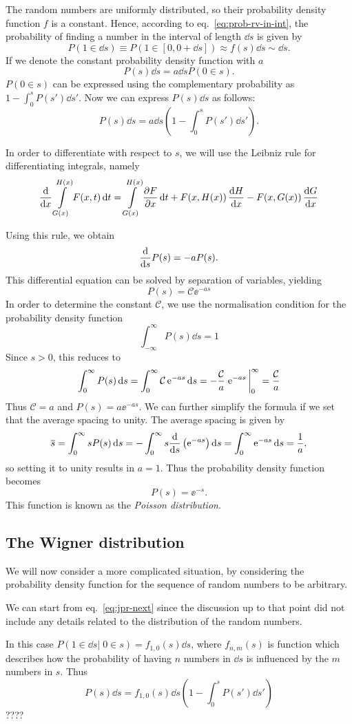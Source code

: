 \documentclass[../thesis.tex]{subfiles}
\theoremstyle{definition}
\begin{document}
The random numbers are uniformly distributed, so their probability density function
\(f\) is a constant. Hence, according to eq.~\eqref{eq:prob-rv-in-int}, the probability
of finding a number in the interval of length \( \dd{s} \) is given by
\[
  P(1 \in \dd{s}) \equiv P(1 \in [0, 0+\dd{s}]) \approx f(s) \dd{s} \sim \dd{s}.
\]
If we denote the constant probability density function with $a$
\[
  P(s)\dd{s} = a \dd{s} P(0 \in s).
\]
\( P(0 \in s) \) can be expressed using the complementary probability as
\( {1 - \int_0^s P(s') \dd{s'}} \). Now we can express \( P(s)\dd{s} \) as follows:
\[
  P(s)\dd{s} = a \dd{s} \left( 1 - \int_0^s P(s') \dd{s'} \right).
\]

In order to differentiate with respect to $s$, we will use the Leibniz rule
for differentiating integrals, namely
\begin{equation}
  \label{eq:leibnitz}
  \dv{x} \int\limits_{G(x)}^{H(x)} F(x, t) \dd{t} = \int\limits_{G(x)}^{H(x)} \pdv{F}{x} \dd{t}
  + F(x, H(x))\, \dv{H}{x} - F(x, G(x))\, \dv{G}{x}
\end{equation}

Using this rule, we obtain
\[
  \dv{s}P(s) = -aP(s).
\]
This differential equation can be solved by separation of variables, yielding
\[
  P(s) = \mathcal{C} \ee^{-as}
\]
In order to determine the constant \(\mathcal{C}\), we use the normalisation condition
for the probability density function
\[
  \int_{-\infty}^{\infty} P(s) \dd{s} = 1
\]
Since \(s>0\), this reduces to
\[
  \int_{0}^{\infty} P(s) \dd{s} = \int_{0}^{\infty} \mathcal{C} \ee^{-as} \dd{s}
  = -\frac{\mathcal{C}}{a} \eval{\ee^{-as}}_0^{\infty} = \frac{\mathcal{C}}{a}
\]
Thus \(\mathcal{C} = a\) and \(P(s) = a \ee^{-as}\).
We can further simplify the formula if we set that the average spacing to unity.
The average spacing is given by
\[
  \overline{s} = \int_{0}^{\infty} s P(s) \dd{s}
  = -\int_{0}^{\infty} s \dv{s} \left( \operatorname{e}^{-as} \right) \dd{s}
  = \int_{0}^{\infty} \operatorname{e}^{-as} \dd{s} = \frac{1}{a},
\]
so setting it to unity results in \(a=1\).
Thus the probability density function becomes
\begin{equation}
  \label{eq:poisson-dist}
  P(s) = \ee^{-s}.
\end{equation}
This function is known as the \emph{Poisson distribution}.

\subsection{The Wigner distribution}

We will now consider a more complicated situation, by considering the
probability density function for the sequence of random numbers to be arbitrary.

We can start from eq.~\eqref{eq:jpr-next} since the discussion up to that point
did not include any details related to the distribution of the random numbers.

In this case \(P(1 \in \dd{s} |\; 0 \in s) = f_{1,0}(s) \dd{s}\), where
\(f_{n,m}(s)\) is function which describes how the probability of having $n$
numbers in \(\dd{s}\) is influenced by the $m$ numbers in $s$.
Thus
\[
  P(s)\dd{s}=f_{1,0}(s)\dd{s} \left( 1 - \int_0^s P(s') \dd{s'} \right)
\]
{\color{red}????}
\end{document}
